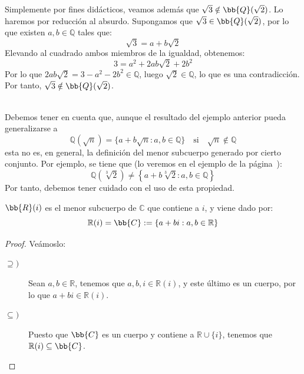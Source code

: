 \begin{ejemplo}
    Simplemente por fines didácticos, veamos además que $\sqrt{3}\notin \bb{Q}(\sqrt{2})$. Lo haremos por reducción al absurdo. Supongamos que $\sqrt{3}\in \bb{Q}(\sqrt{2})$, por lo que existen $a,b\in \mathbb{Q}$ tales que:
    \begin{equation*}
        \sqrt{3} = a+b\sqrt{2}
    \end{equation*}
    Elevando al cuadrado ambos miembros de la igualdad, obtenemos:
    \begin{equation*}
        3 = a^2 + 2ab\sqrt{2} + 2b^2
    \end{equation*}
    Por lo que $2ab\sqrt{2} = 3 - a^2 - 2b^2 \in \mathbb{Q}$, luego $\sqrt{2}\in \mathbb{Q}$, lo que es una contradicción. Por tanto, $\sqrt{3}\notin \bb{Q}(\sqrt{2})$.    
\end{ejemplo}~\\

    Debemos tener en cuenta que, aunque el resultado del ejemplo anterior pueda generalizarse a
    \begin{equation*}
        \mathbb{Q}(\sqrt{n}) = \{a+b\sqrt{n}:a,b\in \mathbb{Q}\} \quad \text{si}\quad  \sqrt{n}\notin \mathbb{Q}
    \end{equation*}
    esta no es, en general, la definición del menor subcuerpo generado por cierto conjunto. Por ejemplo, se tiene que (lo veremos en el ejemplo de la página~\pageref{ej:baseQsqrt3_2}):
    \begin{equation*}
        \mathbb{Q}\left(\sqrt[3]{2}\right) \neq \left\{a+b\sqrt[3]{2}:a,b\in \mathbb{Q}\right\}
    \end{equation*}
    Por tanto, debemos tener cuidado con el uso de esta propiedad.

\begin{ejemplo}
    $\bb{R}(i)$ es el menor subcuerpo de $\mathbb{C}$ que contiene a $i$, y viene dado por:
    \begin{equation*}
        \mathbb{R}(i) = \bb{C} := \left\{a+bi : a,b\in \mathbb{R}\right\}
    \end{equation*}
    \begin{proof}
        Veámoslo:
        \begin{description}
            \item [$\supseteq)$] Sean $a,b\in \mathbb{R}$, tenemos que $a,b,i\in \mathbb{R}(i)$, y este último es un cuerpo, por lo que $a+bi\in \mathbb{R}(i)$.
            \item [$\subseteq)$] Puesto que $\bb{C}$ es un cuerpo y contiene a $\mathbb{R}\cup \{i\}$, tenemos que $\mathbb{R}(i)\subseteq \bb{C}$.
        \end{description}
    \end{proof}
\end{ejemplo}


